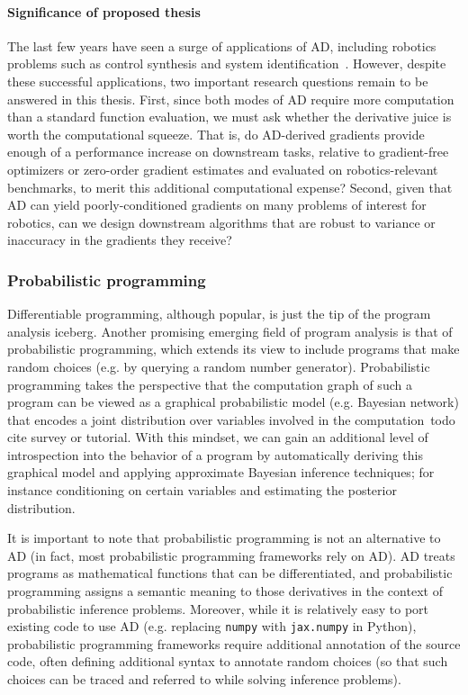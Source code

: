 \paragraph{Significance of proposed thesis} The last few years have seen a surge of applications of AD, including robotics problems such as control synthesis and system identification~\cite{xuAcceleratedPolicyLearning2022,agrawalDifferentiableConvexOptimization2019,amosOptNetDifferentiableOptimization2017,belubute_peres_lcp_physics,du2021underwater}. However, despite these successful applications, two important research questions remain to be answered in this thesis. First, since both modes of AD require more computation than a standard function evaluation, we must ask whether the derivative juice is worth the computational squeeze. That is, do AD-derived gradients provide enough of a performance increase on downstream tasks, relative to gradient-free optimizers or zero-order gradient estimates and evaluated on robotics-relevant benchmarks, to merit this additional computational expense? Second, given that AD can yield poorly-conditioned gradients on many problems of interest for robotics, can we design downstream algorithms that are robust to variance or inaccuracy in the gradients they receive?

\subsubsection{Probabilistic programming}

Differentiable programming, although popular, is just the tip of the program analysis iceberg. Another promising emerging field of program analysis is that of probabilistic programming, which extends its view to include programs that make random choices (e.g. by querying a random number generator). Probabilistic programming takes the perspective that the computation graph of such a program can be viewed as a graphical probabilistic model (e.g. Bayesian network) that encodes a joint distribution over variables involved in the computation~todo cite survey or tutorial. With this mindset, we can gain an additional level of introspection into the behavior of a program by automatically deriving this graphical model and applying approximate Bayesian inference techniques; for instance conditioning on certain variables and estimating the posterior distribution.

It is important to note that probabilistic programming is not an alternative to AD (in fact, most probabilistic programming frameworks rely on AD). AD treats programs as mathematical functions that can be differentiated, and probabilistic programming assigns a semantic meaning to those derivatives in the context of probabilistic inference problems. Moreover, while it is relatively easy to port existing code to use AD (e.g. replacing \texttt{numpy} with \texttt{jax.numpy} in Python), probabilistic programming frameworks require additional annotation of the source code, often defining additional syntax to annotate random choices (so that such choices can be traced and referred to while solving inference problems).

